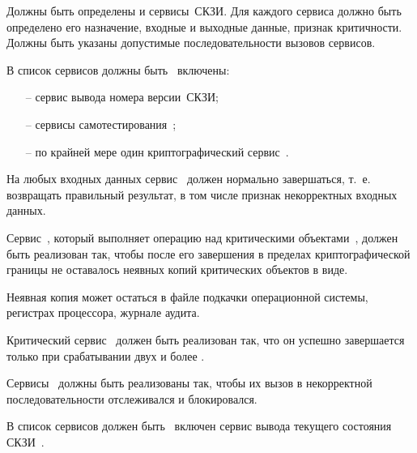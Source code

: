 \label{R.SV.List}
Должны быть определены и   
сервисы~СКЗИ.
%
Для каждого сервиса должно быть определено его назначение, 
входные и выходные данные, признак критичности.
%
Должны быть указаны допустимые последовательности вызовов сервисов.

\label{R.SV.Oblig}
В список сервисов должны быть~ включены:
\begin{itemize}
\item[--]
сервис вывода номера версии~СКЗИ;
\item[--]
сервисы самотестирования~;
\item[--]
по крайней мере один криптографический сервис~.
\end{itemize}

\label{R.SV.Robust}
На любых входных данных сервис~ должен нормально 
завершаться, т.~е. возвращать правильный результат,  
в том числе признак некорректных входных данных.

\label{R.SV.Leaks}
Сервис~, который выполняет операцию над критическими
объектами~, должен быть реализован так, чтобы после его
завершения в пределах криптографической границы не оставалось 
неявных копий критических объектов в  виде.

\begin{note*}
Неявная копия может остаться в файле подкачки операционной системы, 
регистрах процессора, журнале аудита. 
\end{note*}

\label{R.SV.Crit}
Критический сервис~ должен быть реализован так,
что он успешно завершается только при срабатывании двух и более 
.

\label{R.SV.Seq}
Сервисы~ должны быть реализованы так, чтобы их вызов в
некорректной последовательности отслеживался и блокировался.

\label{R.SV.Status}
В список сервисов должен быть~ включен
сервис вывода текущего состояния СКЗИ~.

